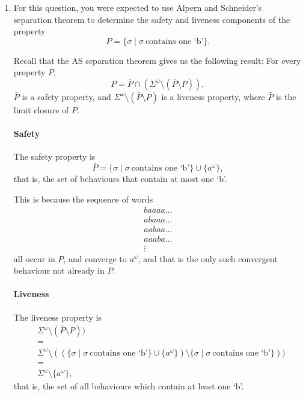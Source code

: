 \documentclass{article}
\begin{document}
\begin{enumerate}
  \item {
    For this question, you were expected to use Alpern and Schneider's
    separation theorem to determine the safety and liveness components of the property
    $$P = \{ \sigma \mid \sigma\ \text{contains one `b'} \}.$$

    Recall that the AS separation theorem gives us the following result:
    For every property $P$,
      $$P = \bar{P} \cap (\Sigma^\omega \setminus (\bar{P} \setminus P)),$$
    $\bar{P}$ is a safety property, and
    $\Sigma^\omega \setminus (\bar{P} \setminus P)$ is a liveness property,
    where $\bar{P}$ is the limit closure of $P$.

    \paragraph{Safety} The safety property is
    $$\bar{P} = \{ \sigma \mid \sigma\ \text{contains one `b'} \} \cup \{ a^\omega \},$$
    that is, the set of behaviours that contain at most one `b'.

    This is because the sequence of words
    \begin{gather*}
      baaaa\dots\\
      abaaa\dots\\
      aabaa\dots\\
      aaaba\dots\\
      \vdots
    \end{gather*}
    all occur in $P$, and converge to $a^\omega$,
    and that is the only such convergent behaviour not already in $P$.

    \paragraph{Liveness} The liveness property is
    \begin{align*}
      &\Sigma^\omega \setminus (\bar{P} \setminus P)) \\
      &= \\
      &\Sigma^\omega \setminus ((\{ \sigma \mid \sigma\ \text{contains one `b'} \}
        \cup \{ a^\omega \}) \setminus \{ \sigma \mid \sigma\ \text{contains one `b'} \})) \\
      &= \\
      &\Sigma^\omega \setminus \{ a^\omega \},
    \end{align*}
    that is, the set of all behaviours which contain at least one `b'.

}
\end{enumerate}
\end{document}
